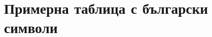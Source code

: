 \documentclass[a4paper,12pt]{article}
\begin{document}
\section*{Примерна таблица с български символи}


\end{document}
